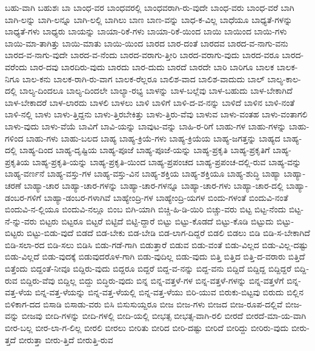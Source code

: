 {ಬಹು-ವಾಗಿ
ಬಹುಶಃ
ಬಾ
ಬಾಂಧ-ವರ
ಬಾಂಧವರಲ್ಲಿ
ಬಾಂಧವರಾಗಿ-ರು-ವುದೇ
ಬಾಂಧ-ವರು
ಬಾಂಧ-ವರೆ
ಬಾಗಿ
ಬಾಗಿ-ಲನ್ನು
ಬಾಗಿ-ಲನ್ನೂ
ಬಾಗಿ-ಲಲ್ಲಿ
ಬಾಗಿಲು
ಬಾಣ
ಬಾಣ-ವನ್ನು
ಬಾಧ-ಕ-ವಿಲ್ಲ
ಬಾಧೆಯೂ
ಬಾಧ್ಯತೆ-ಗಳನ್ನು
ಬಾಧ್ಯತೆ-ಗಳು
ಬಾಧ್ಯರು
ಬಾಯನ್ನು
ಬಾಯಾ-ರಿಕೆ-ಗಳು
ಬಾಯಾ-ರಿಕೆ-ಯಿಂದ
ಬಾಯಿ
ಬಾಯಿಂದ
ಬಾಯಿ-ಗಳು
ಬಾಯಿ-ಮಾ-ತಾಗಿತ್ತು
ಬಾಯಿ-ಮಾತು
ಬಾಯಿ-ಯಿಂದ
ಬಾರದ
ಬಾರ-ದಂತೆ
ಬಾರದವ
ಬಾರದ-ವ-ನಾಗು-ವನು
ಬಾರದ-ವ-ನಾಗು-ವುದೇ
ಬಾರದ-ವ-ನೆಂದು
ಬಾರದ-ವರಾಗು-ತ್ತೀರಿ
ಬಾರದ-ವರಾಗು-ವುದು
ಬಾರದ-ವರೂ
ಬಾರದ-ವರೆಂದು
ಬಾರ-ದವು
ಬಾರದಿರು-ವುದು
ಬಾರದು
ಬಾರ-ದುದು
ಬಾರದೆ
ಬಾರದೇ
ಬಾರಿ
ಬಾರಿಗೂ
ಬಾಲಕ
ಬಾಲಕ-ನಿಗೂ
ಬಾಲ-ಕನು
ಬಾಲಕ-ರಾಗಿ-ರು-ವಾಗ
ಬಾಲಕ-ರೆಲ್ಲರೂ
ಬಾಲಿಶ-ವಾದ
ಬಾಲಿಶ-ವಾದುದು
ಬಾಲ್
ಬಾಲ್ಯ-ಕಾಲ-ದಲ್ಲಿ
ಬಾಲ್ಯ-ದಿಂದಲೂ
ಬಾಲ್ಯ-ದಿಂದಲೇ
ಬಾಲ್ಯಾ-ರಭ್ಯ
ಬಾಳನ್ನು
ಬಾಳ-ಬಲ್ಲೆವು
ಬಾಳ-ಬಹುದು
ಬಾಳ-ಬೇಕಾಗಿದೆ
ಬಾಳ-ಬೇಕಾದರೆ
ಬಾಳ-ಲಾರದು
ಬಾಳಲಿ
ಬಾಳಲು
ಬಾಳಿ
ಬಾಳಿಗೆ
ಬಾಳಿ-ದ-ವ-ನನ್ನು
ಬಾಳಿದೆ
ಬಾಳಿನ
ಬಾಳಿ-ನಂತೆ
ಬಾಳಿ-ನಲ್ಲಿ
ಬಾಳು
ಬಾಳು-ತ್ತಿದ್ದನು
ಬಾಳು-ತ್ತಿರಬೇಕಿತ್ತು
ಬಾಳು-ತ್ತಿರು-ವೆವು
ಬಾಳುವ
ಬಾಳು-ವಂತಹ
ಬಾಳು-ವಂತಾಗಲಿ
ಬಾಳು-ವುದು
ಬಾಳು-ವೆಯೆ
ಬಾವಿಗೆ
ಬಾವಿ-ಯನ್ನು
ಬಾವುಟ-ವನ್ನು
ಬಾಹಿ-ರ-ರಿಗೆ
ಬಾಹು-ಗಳ
ಬಾಹು-ಗಳನ್ನು
ಬಾಹು-ಗಳಿಂದ
ಬಾಹು-ಗಳು
ಬಾಹು-ಬಲದ
ಬಾಹ್ಯ
ಬಾಹ್ಯ-ಕ್ರಿಯೆ-ಗಳು
ಬಾಹ್ಯ-ಕ್ರಿಯೆಯ
ಬಾಹ್ಯ-ಜಗತ್ತನ್ನು
ಬಾಹ್ಯದ
ಬಾಹ್ಯ-ದಲ್ಲಿ
ಬಾಹ್ಯ-ದಿಂದ
ಬಾಹ್ಯ-ದೃಷ್ಟಿಯ
ಬಾಹ್ಯ-ಪೂಜೆ
ಬಾಹ್ಯ-ಪೂಜೆ-ಯನ್ನು
ಬಾಹ್ಯ-ಪ್ರಕೃತಿ
ಬಾಹ್ಯ-ಪ್ರಕೃತಿಗೆ
ಬಾಹ್ಯ-ಪ್ರಕೃತಿಯ
ಬಾಹ್ಯ-ಪ್ರಕೃತಿ-ಯನ್ನು
ಬಾಹ್ಯ-ಪ್ರಕೃತಿ-ಯಿಂದ
ಬಾಹ್ಯ-ಪ್ರಪಂಚದ
ಬಾಹ್ಯ-ಪ್ರಪಂಚ-ದಲ್ಲಿ-ರುವ
ಬಾಹ್ಯ-ವನ್ನು
ಬಾಹ್ಯ-ವರ್ಣನೆ
ಬಾಹ್ಯ-ವಸ್ತು-ಗಳ
ಬಾಹ್ಯ-ವಸ್ತು-ವಿನ
ಬಾಹ್ಯ-ಶಕ್ತಿಯ
ಬಾಹ್ಯ-ಶಕ್ತಿಯೂ
ಬಾಹ್ಯ-ಶುದ್ಧಿ
ಬಾಹ್ಯಾ
ಬಾಹ್ಯಾ-ಚರಣೆ
ಬಾಹ್ಯಾ-ಚಾರ
ಬಾಹ್ಯಾ-ಚಾರ-ಗಳನ್ನು
ಬಾಹ್ಯಾ-ಚಾರ-ಗಳನ್ನೂ
ಬಾಹ್ಯಾ-ಚಾರ-ಗಳು
ಬಾಹ್ಯಾ-ಚಾರ-ದಲ್ಲಿ
ಬಾಹ್ಯಾ-ಡಂಬರ-ಗಳಿಗೆ
ಬಾಹ್ಯಾ-ಡಂಬರ-ಗಳಾಗಿವೆ
ಬಾಹ್ಯೇಂದ್ರಿ-ಗಳ
ಬಾಹ್ಯೇಂದ್ರಿ-ಯಗಳ
ಬಿಂದು-ಗಳಂತೆ
ಬಿಂದುವಿ-ನಂತೆ
ಬಿಂದುವಿ-ನ-ಲ್ಲಿಯೂ
ಬಿಂದುವಿ-ನಲ್ಲೂ
ಬಿಂಬ
ಬಿಗಿ-ಯಾಗಿ
ಬಿಚ್ಚಿ-ಹಿ-ಡಿ-ಯಿರಿ
ಬಿಚ್ಚು-ವರು
ಬಿಟ್ಟ
ಬಿಟ್ಟ-ನೆಂದು
ಬಿಟ್ಟ-ನೆ-ನ್ನು-ವರು
ಬಿಟ್ಟರು
ಬಿಟ್ಟರೂ
ಬಿಟ್ಟರೆ
ಬಿಟ್ಟಿದೆ
ಬಿಟ್ಟಿ-ದ್ದಾರೆ
ಬಿಟ್ಟು
ಬಿಟ್ಟು-ಕೊಡದೆ
ಬಿಟ್ಟು-ಕೊಡಿ
ಬಿಟ್ಟುದು
ಬಿಟ್ಟು-ಬಿಟ್ಟರು
ಬಿಟ್ಟು-ಬಿಡು-ವುದೆ
ಬಿಡದೆ
ಬಿಡ-ಬೇಕು
ಬಿಡ-ಬೇಡಿ
ಬಿಡ-ಲಾಗ-ದಿದ್ದರೆ
ಬಿಡಲಿ
ಬಿಡಲು
ಬಿಡಿ
ಬಿಡಿ-ಸ-ಬೇಕಾಗಿದೆ
ಬಿಡಿ-ಸಲಾ-ರದ
ಬಿಡಿ-ಸಲು
ಬಿಡಿಸಿ
ಬಿಡು-ಗಡೆ-ಗಾಗಿ
ಬಿಡುತ್ತಾರೆ
ಬಿಡುವ
ಬಿಡು-ವಂತೆ
ಬಿಡು-ವಿಲ್ಲದ
ಬಿಡು-ವಿಲ್ಲ-ದಷ್ಟು
ಬಿಡು-ವಿಲ್ಲದೆ
ಬಿಡು-ವುದಕ್ಕೆ
ಬಿಡುವುದರೊಳ-ಗಾಗಿ
ಬಿಡು-ವುದಿಲ್ಲ
ಬಿಡು-ವುದು
ಬಿತ್ತಿ
ಬಿತ್ತಿದ
ಬಿತ್ತಿ-ದ-ವರಾರು
ಬಿತ್ತಿದೆ
ಬಿತ್ತೆಂದು
ಬಿದ್ದಂತೆ-ನೀವೂ
ಬಿದ್ದಿರು-ವುದು
ಬಿದ್ದರೂ
ಬಿದ್ದರೆ
ಬಿದ್ದ-ವ-ನನ್ನು
ಬಿದ್ದ-ವನು
ಬಿದ್ದಿದೆ
ಬಿದ್ದಿದ್ದ
ಬಿದ್ದಿದ್ದರೆ
ಬಿದ್ದಿ-ರುವ
ಬಿದ್ದಿರು-ವೆವು
ಬಿದ್ದಿಲ್ಲ
ಬಿದ್ದು
ಬಿದ್ಧಿರು-ವುದು
ಬಿನ್ನ
ಬಿನ್ನ-ವತ್ತಳೆ-ಗಳ
ಬಿನ್ನ-ವತ್ತಳೆ-ಗಳನ್ನು
ಬಿನ್ನ-ವತ್ತಳೆಗೆ
ಬಿನ್ನ-ವತ್ತ-ಳೆಯ
ಬಿನ್ನ-ವತ್ತ-ಳೆಯನ್ನು
ಬಿನ್ನ-ವತ್ತ-ಳೆಯಲ್ಲಿ
ಬಿನ್ನ-ವತ್ತ-ಳೆಯು
ಬಿರಿ-ಯುವ
ಬಿರುಕು-ಬಿಟ್ಟವು
ಬಿರುದು
ಬಿಲ್ಲಿನ
ಬಿಳಿಕಾಗ-ದದ
ಬಿಸಾಡಿ
ಬಿಸಾಡು-ವರು
ಬಿಸಿ
ಬಿಸುಸುಯ್ದರೂ
ಬೀಜ
ಬೀಜ-ಗಳು
ಬೀಜದ
ಬೀಜ-ರೂಪ-ದಲ್ಲಿವೆ
ಬೀಜ-ವನ್ನು
ಬೀಜವು
ಬೀದಿ-ಗಳನ್ನು
ಬೀದಿ-ಗಳಲ್ಲಿ
ಬೀದಿ-ಯಲ್ಲಿ
ಬೀಭತ್ಸ
ಬೀಭತ್ಸ-ವಾಗಿ-ರಲಿ
ಬೀರದೆ
ಬೀರದೆ-ಮಾ-ಯ-ವಾಗಿ
ಬೀರ-ಬಲ್ಲ
ಬೀರ-ಲಾ-ಗ-ಲಿಲ್ಲ
ಬೀರಲಿ
ಬೀರಲು
ಬೀರಿತು
ಬೀರಿದ
ಬೀರಿ-ದಷ್ಟು
ಬೀರಿದೆ
ಬೀರಿದ್ದು
ಬೀರಿರು-ವುದು
ಬೀರು-ತ್ತದೆ
ಬೀರುತ್ತಾ
ಬೀರು-ತ್ತಿದೆ
ಬೀರುತ್ತಿ-ರುವ
}
